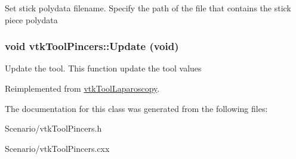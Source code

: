 Set stick polydata filename. Specify the path of the file that contains the stick piece polydata \hypertarget{classvtkToolPincers_a57986aee2bcfa04472410cd7bf5c7929}{
\subsubsection[{Update}]{\setlength{\rightskip}{0pt plus 5cm}void vtkToolPincers::Update (void)}}
\label{classvtkToolPincers_a57986aee2bcfa04472410cd7bf5c7929}


Update the tool. This function update the tool values 

Reimplemented from \hyperlink{classvtkToolLaparoscopy_a4445a0cfabd77b50a06929b04cb71f9e}{vtkToolLaparoscopy}.

The documentation for this class was generated from the following files:\begin{DoxyCompactItemize}
\item 
Scenario/vtkToolPincers.h\item 
Scenario/vtkToolPincers.cxx\end{DoxyCompactItemize}
